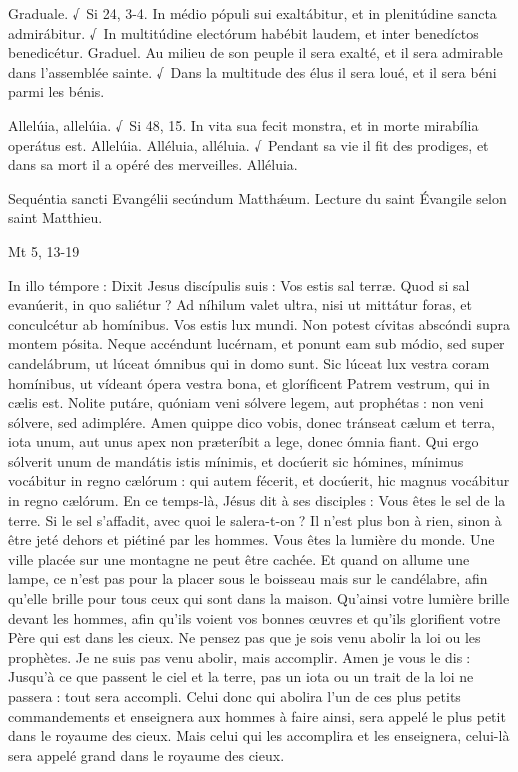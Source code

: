 \begin{paracol}{2}
Graduale. √~Si 24, 3-4. In médio pópuli sui exaltábitur, et in plenitúdine sancta admirábitur. √~In multitúdine electórum habébit laudem, et inter benedíctos benedicétur.
\switchcolumn
Graduel. Au milieu de son peuple il sera exalté, et il sera admirable dans l’assemblée sainte. √~Dans la multitude des élus il sera loué, et il sera béni parmi les bénis.
\switchcolumn*

Allelúia, allelúia. √~Si 48, 15. In vita sua fecit monstra, et in morte mirabília operátus est. Allelúia.
\switchcolumn
Alléluia, alléluia. √~Pendant sa vie il fit des prodiges, et dans sa mort il a opéré des merveilles. Alléluia.
\switchcolumn*

Sequéntia sancti Evangélii secúndum Matthǽum.
\switchcolumn
Lecture du saint Évangile selon saint Matthieu.
\switchcolumn*

Mt 5, 13-19
\switchcolumn

\switchcolumn*

In illo témpore : Dixit Jesus discípulis  suis : Vos estis sal terræ. Quod si sal evanúerit, in quo saliétur ? Ad níhilum valet ultra, nisi ut mittátur foras, et conculcétur ab homínibus. Vos estis lux mundi. Non potest cívitas abscóndi supra montem pósita. Neque accéndunt lucérnam, et ponunt eam sub módio, sed super candelábrum, ut lúceat ómnibus qui in domo sunt. Sic lúceat lux vestra coram homínibus, ut vídeant ópera vestra bona, et gloríficent Patrem vestrum, qui in cælis est. Nolite putáre, quóniam veni sólvere legem, aut prophétas : non veni sólvere, sed adimplére. Amen quippe dico vobis, donec tránseat cælum et terra, iota unum, aut unus apex non præteríbit a lege, donec ómnia fiant. Qui ergo sólverit unum de mandátis istis mínimis, et docúerit sic hómines, mínimus vocábitur in regno cælórum : qui autem fécerit, et docúerit, hic magnus vocábitur in regno cælórum.
\switchcolumn
En ce temps-là, Jésus dit à ses disciples :  Vous êtes le sel de la terre. Si le sel s’affadit, avec quoi le salera-t-on ? Il n’est plus bon à rien, sinon à être jeté dehors et piétiné par les hommes. Vous êtes la lumière du monde. Une ville placée sur une montagne ne peut être cachée. Et quand on allume une lampe, ce n’est pas pour la placer sous le boisseau mais sur le candélabre, afin qu’elle brille pour tous ceux qui sont dans la maison. Qu’ainsi votre lumière brille devant les hommes, afin qu’ils voient vos bonnes œuvres et qu’ils glorifient votre Père qui est dans les cieux. Ne pensez pas que je sois venu abolir la loi ou les prophètes. Je ne suis pas venu abolir, mais accomplir. Amen je vous le dis : Jusqu’à ce que passent le ciel et la terre, pas un iota ou un trait de la loi ne passera : tout sera accompli. Celui donc qui abolira l’un de ces plus petits commandements et enseignera aux hommes à faire ainsi, sera appelé le plus petit dans le royaume des cieux. Mais celui qui les accomplira et les enseignera, celui-là sera appelé grand dans le royaume des cieux.
\switchcolumn*


\end{paracol}

